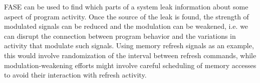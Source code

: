 FASE can be used to find which parts of a system leak information about some aspect of program activity. Once the source of the leak is found, the strength of modulated signals can be reduced and the modulation can be weakened, i.e. we can disrupt the connection between program behavior and the variations in activity that modulate such signals. Using memory refresh signals as an example, this would involve randomization of the interval between refresh commands, while modulation-weakening efforts might involve careful scheduling of memory accesses to avoid their interaction with refresh activity.


